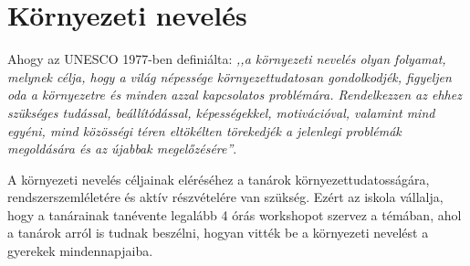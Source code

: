 \section{Környezeti nevelés}
\label{sec:kornyezeti-neveles}
Ahogy az UNESCO 1977-ben definiálta: \emph{,,a környezeti nevelés olyan folyamat,
    melynek célja, hogy a világ népessége környezettudatosan gondolkodjék, figyeljen oda a környezetre és minden azzal kapcsolatos problémára. Rendelkezzen az ehhez szükséges tudással, beállítódással, képességekkel, motivációval, valamint mind egyéni, mind közösségi téren eltökélten törekedjék a jelenlegi problémák megoldására és az újabbak megelőzésére”}.

A környezeti nevelés céljainak eléréséhez a tanárok környezettudatosságára, rendszerszemléletére és aktív részvételére van szükség. Ezért az iskola vállalja, hogy a tanárainak tanévente legalább 4 órás workshopot szervez a témában, ahol a tanárok arról  is tudnak beszélni, hogyan vitték be a környezeti nevelést a gyerekek mindennapjaiba.
